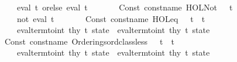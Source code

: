 \begin{isabellebody}
\ \ \ \ \ \ \ \ \ \ {\isacharparenleft}{\kern0pt}eval\ t{}{\isacharparenright}{\kern0pt}\ orelse\ {\isacharparenleft}{\kern0pt}eval\ t{}{\isacharparenright}{\kern0pt}\isanewline
\ \ \ \ \ \ {\isacharbar}{\kern0pt}\ Const\ {\isacharparenleft}{\kern0pt}{\isacharat}{\kern0pt}{\isacharbraceleft}{\kern0pt}const{\isacharunderscore}{\kern0pt}name\ {\isachardoublequote}{\kern0pt}HOL{\isachardot}{\kern0pt}Not{\isachardoublequote}{\kern0pt}{\isacharbraceright}{\kern0pt}{\isacharcomma}{\kern0pt}\ {\isacharunderscore}{\kern0pt}{\isacharparenright}{\kern0pt}\ {\isachardollar}{\kern0pt}\ t{}\ {\isacharequal}{\kern0pt}{\isachargreater}{\kern0pt}\isanewline
\ \ \ \ \ \ \ \ \ \ not\ {\isacharparenleft}{\kern0pt}eval\ t{}{\isacharparenright}{\kern0pt}\isanewline
\ \ \ \ \ \ {\isacharbar}{\kern0pt}\ Const\ {\isacharparenleft}{\kern0pt}{\isacharat}{\kern0pt}{\isacharbraceleft}{\kern0pt}const{\isacharunderscore}{\kern0pt}name\ {\isachardoublequote}{\kern0pt}HOL{\isachardot}{\kern0pt}eq{\isachardoublequote}{\kern0pt}{\isacharbraceright}{\kern0pt}{\isacharcomma}{\kern0pt}\ {\isacharunderscore}{\kern0pt}{\isacharparenright}{\kern0pt}\ {\isachardollar}{\kern0pt}\ t{}\ {\isachardollar}{\kern0pt}\ t{}\ {\isacharequal}{\kern0pt}{\isachargreater}{\kern0pt}\isanewline
\ \ \ \ \ \ \ \ \ \ {\isacharparenleft}{\kern0pt}eval{\isacharunderscore}{\kern0pt}term{\isacharunderscore}{\kern0pt}to{\isacharunderscore}{\kern0pt}int\ thy\ t{}\ state{\isacharparenright}{\kern0pt}\ {\isacharequal}{\kern0pt}\ {\isacharparenleft}{\kern0pt}eval{\isacharunderscore}{\kern0pt}term{\isacharunderscore}{\kern0pt}to{\isacharunderscore}{\kern0pt}int\ thy\ t{}\ state{\isacharparenright}{\kern0pt}\isanewline
\ \ \ \ \ \ {\isacharbar}{\kern0pt}\ Const\ {\isacharparenleft}{\kern0pt}{\isacharat}{\kern0pt}{\isacharbraceleft}{\kern0pt}const{\isacharunderscore}{\kern0pt}name\ {\isachardoublequote}{\kern0pt}Orderings{\isachardot}{\kern0pt}ord{\isacharunderscore}{\kern0pt}class{\isachardot}{\kern0pt}less{\isachardoublequote}{\kern0pt}{\isacharbraceright}{\kern0pt}{\isacharcomma}{\kern0pt}\ {\isacharunderscore}{\kern0pt}{\isacharparenright}{\kern0pt}\ {\isachardollar}{\kern0pt}\ t{}\ {\isachardollar}{\kern0pt}\ t{}\ {\isacharequal}{\kern0pt}{\isachargreater}{\kern0pt}\isanewline
\ \ \ \ \ \ \ \ \ \ {\isacharparenleft}{\kern0pt}eval{\isacharunderscore}{\kern0pt}term{\isacharunderscore}{\kern0pt}to{\isacharunderscore}{\kern0pt}int\ thy\ t{}\ state{\isacharparenright}{\kern0pt}\ {\isacharless}{\kern0pt}\ {\isacharparenleft}{\kern0pt}eval{\isacharunderscore}{\kern0pt}term{\isacharunderscore}{\kern0pt}to{\isacharunderscore}{\kern0pt}int\ thy\ t{}\ state{\isacharparenright}{\kern0pt}\isanewline

\end{isabellebody}
